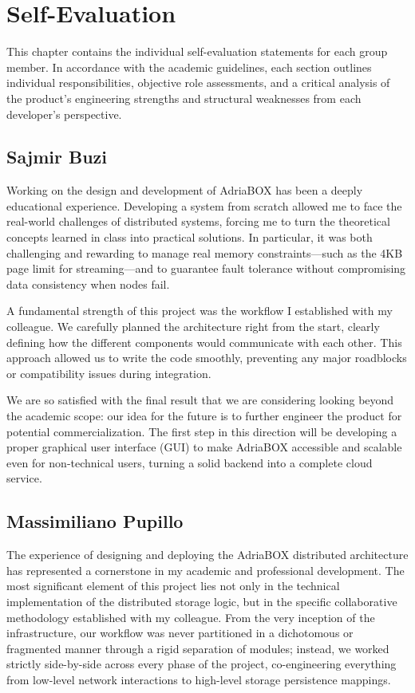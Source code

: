 \section{Self-Evaluation}
\label{sec:self_evaluation}

This chapter contains the individual self-evaluation statements for each group member. In accordance with the academic guidelines, each section outlines individual responsibilities, objective role assessments, and a critical analysis of the product's engineering strengths and structural weaknesses from each developer's perspective.

\subsection{Sajmir Buzi}
\label{subsec:eval_sajmir}
Working on the design and development of AdriaBOX has been a deeply educational experience.
Developing a system from scratch allowed me to face the real-world challenges of distributed
systems, forcing me to turn the theoretical concepts learned in class into practical solutions.
In particular, it was both challenging and rewarding to manage real memory constraints—such
as the 4KB page limit for streaming—and to guarantee fault tolerance without compromising
data consistency when nodes fail.

A fundamental strength of this project was the workflow I established with my colleague.
We carefully planned the architecture right from the start, clearly defining how the different
components would communicate with each other. This approach allowed us to write the code
smoothly, preventing any major roadblocks or compatibility issues during integration.

We are so satisfied with the final result that we are considering looking beyond the academic
scope: our idea for the future is to further engineer the product for potential commercialization.
The first step in this direction will be developing a proper graphical user interface (GUI) to
make AdriaBOX accessible and scalable even for non-technical users, turning a solid backend
into a complete cloud service.

\subsection{Massimiliano Pupillo}
\label{subsec:eval_massimiliano}
The experience of designing and deploying the AdriaBOX distributed architecture has represented a cornerstone in my academic and professional development. The most significant element of this project lies not only in the technical implementation of the distributed storage logic, but in the specific collaborative methodology established with my colleague. From the very inception of the infrastructure, our workflow was never partitioned in a dichotomous or fragmented manner through a rigid separation of modules; instead, we worked strictly side-by-side across every phase of the project, co-engineering everything from low-level network interactions to high-level storage persistence mappings.

